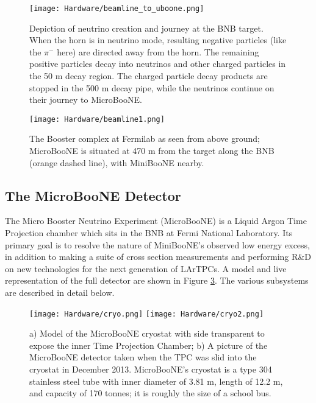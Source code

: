 \begin{figure}[H]
\centering
\texttt{[image: Hardware/beamline\_to\_uboone.png]}
\caption{ Depiction of neutrino creation and journey at the BNB target. When the horn is in neutrino mode, resulting negative particles (like the $\pi^-$ here) are directed away from the horn.  The remaining positive particles decay into neutrinos and other charged particles in the 50 m decay region.  The charged particle decay products are stopped in the 500 m decay pipe, while the neutrinos continue on their journey to MicroBooNE.}
\label{fig:beamline2}
\end{figure}


\begin{figure}[h!]
\centering
\texttt{[image: Hardware/beamline1.png]}
\caption{ The Booster complex at Fermilab as seen from above ground; MicroBooNE is situated at 470 m from the target along the BNB (orange dashed line), with MiniBooNE nearby. }
\label{fig:beamline1}
\end{figure}


\subsection{The MicroBooNE Detector}
The Micro Booster Neutrino Experiment (MicroBooNE) is a Liquid Argon Time Projection chamber which sits in the BNB at Fermi National Laboratory.  Its primary goal is to resolve the nature of MiniBooNE's observed low energy excess, in addition to making a suite of cross section measurements and performing R\&D on new technologies for the next generation of LArTPCs. A model and live representation of the full detector are shown in Figure \ref{fig:cryo2}. The various subsystems are described in detail below.

\begin{figure}[H]
    \centering
\texttt{[image: Hardware/cryo.png]}
  \hspace{1mm}
\texttt{[image: Hardware/cryo2.png]}
\caption{a) Model of the MicroBooNE cryostat with side transparent to expose the inner Time Projection Chamber; b) A picture of the MicroBooNE detector taken when the TPC was slid into the cryostat in December 2013.  MicroBooNE's cryostat is a type 304 stainless steel tube with inner diameter of 3.81 m, length of 12.2 m, and capacity of 170 tonnes; it is roughly the size of a school bus. }
\label{fig:cryo2}
\end{figure}


